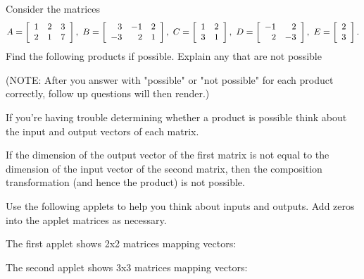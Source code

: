 \documentclass{ximera}
\author{Zack Reed}
\begin{document}
\begin{exercise}

    Consider the matrices
    \begin{equation*}
      A = \startmat{rrr}
        1 & 2 & 3 \\
        2 & 1 & 7
      \stopmat,\quad
      B = \startmat{rrr}
        3 & -1 & 2 \\
        -3 & 2 & 1
      \stopmat,\quad
      C = \startmat{rr}
        1 & 2 \\
        3 & 1
      \stopmat,\quad
      D = \startmat{rr}
        -1 & 2 \\
        2 & -3
      \stopmat,\quad
      E = \startmat{r}
        2 \\
        3
      \stopmat.
    \end{equation*}
    Find the following products if possible. Explain any that are not possible

    (NOTE: After you answer with "possible" or "not possible" for each product correctly, follow up questions will then render.)

\begin{hint}

    If you're having trouble determining whether a product is possible think about the input and output vectors of each matrix. 

    If the dimension of the output vector of the first matrix is not equal to the dimension of the input vector of the second matrix, then the composition transformation (and hence the product) is not possible.

    Use the following applets to help you think about inputs and outputs. Add zeros into the applet matrices as necessary.

    The first applet shows 2x2 matrices mapping vectors:

    \begin{center}
    

    \end{center}

    The second applet shows 3x3 matrices mapping vectors:

    \begin{center}
    

    \end{center}

\end{hint}


\end{exercise}
\end{document}
